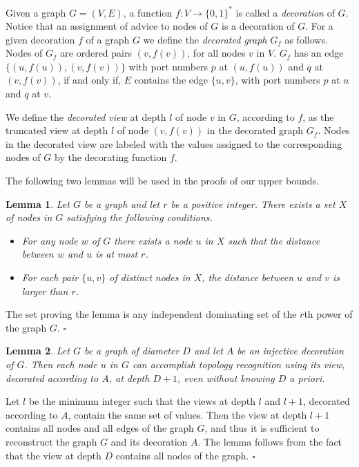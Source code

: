 \documentclass{article}
\newcommand*{\qed}{\hfill\ensuremath{\square}}
\newtheorem{lemma}{Lemma}[section]
\newenvironment{proof}{\noindent{\bf Proof:}}{\qed}
\begin{document}
Given a graph $G=(V,E)$, a function $f : V \longrightarrow \{0,1\}^{*}$ is called a {\em decoration} of $G$.
Notice that an assignment of advice to nodes of $G$ is a decoration of $G$.
For a given decoration $f$ of a graph $G$ we define the {\em decorated graph} $G_f$ as follows. Nodes of $G_f$ are ordered pairs $(v,f(v))$, for all nodes $v$ in $V$.
$G_f$ has an edge $\{(u,f(u)),(v,f(v))\}$ with port numbers $p$ at $(u,f(u))$ and $q$ at $(v,f(v))$, if and only if,
$E$ contains the edge $\{u,v\}$, with port numbers $p$ at $u$ and $q$ at $v$.

We define  the {\em decorated view} at depth $l$ of node $v$ in $G$, according to $f$, as the truncated view at depth $l$ of node $(v, f(v))$ in the decorated graph $G_f$. Nodes in the decorated view are labeled with the values assigned to the corresponding nodes of $G$ by the decorating function $f$.

The following two lemmas will be used in the proofs of our upper bounds.

\begin{lemma}\label{lemDominating}
Let $G$ be a graph and let $r$ be a positive integer. There exists a set $X$ of nodes in  $G$ satisfying the following conditions. 
\begin{itemize}
\item For any node $w$ of $G$ there exists a node $u$ in $X$ such that the distance between $w$ and $u$ is at most $r$.
\item For each pair $\{u,v\}$ of distinct nodes in $X$, the distance between $u$ and $v$ is larger than $r$.
\end{itemize}
\end{lemma}
\begin{proof}
The set proving the lemma is any independent dominating set of the $r$th power of the graph $G$.
\end{proof}

\begin{lemma}\label{lemUniqueLabels}
Let $G$ be a graph of diameter $D$ and let $A$ be an injective  decoration of $G$. Then each node $u$ in $G$ can accomplish topology recognition using its view, decorated according to $A$, at depth $D+1$, even without knowing $D$ a priori.
\end{lemma}
\begin{proof}
Let $l$ be the minimum integer such that the views at depth  $l$ and $l+1$, decorated according to $A$, contain the same set of values.
Then the view at depth $l+1$ contains all nodes and all edges of the graph $G$, and thus it is sufficient to reconstruct the graph $G$ and its decoration $A$.
The lemma follows from the fact that the view at depth $D$ contains all nodes of the graph.  
\end{proof}
\end{document}
